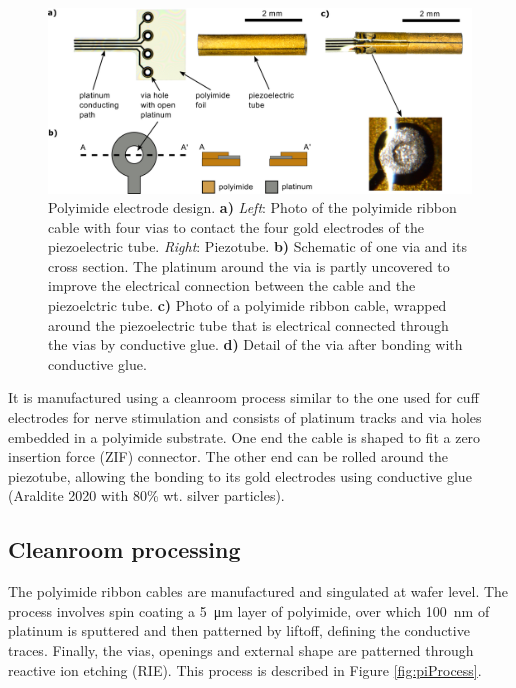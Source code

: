 \begin{figure}[h!]\centering \includegraphics[width=15cm]{figures/40_Fabrication/PI/tubeFoilH.png}
      \caption{Polyimide electrode design.
      \textbf{a)} \textit{Left}: Photo of the polyimide ribbon cable with four vias to contact the four gold electrodes of the piezoelectric tube. \textit{Right}: Piezotube.
      \textbf{b)} Schematic of one via and its cross section. The platinum around the via is partly uncovered to improve the electrical connection between the cable and the piezoelctric tube.
      \textbf{c)} Photo of a polyimide ribbon cable, wrapped around the piezoelectric tube that is electrical connected through the vias by conductive glue.
      \textbf{d)} Detail of the via after bonding with conductive glue.}
      \label{fig:piRolled}
\end{figure}

It is manufactured using a cleanroom process similar to the one used for cuff electrodes for nerve stimulation \cite{Rodriguez2000} and consists of platinum tracks and via holes embedded in a polyimide substrate. One end the cable is shaped to fit a zero insertion force (ZIF) connector. The other end can be rolled around the piezotube, allowing the bonding to its gold electrodes using conductive glue (Araldite 2020 with 80\% wt. silver particles).


\subsection{Cleanroom processing}
The polyimide ribbon cables are manufactured and singulated at wafer level. The process involves spin coating a \SI{5}{\micro\meter} layer of polyimide, over which \SI{100}{\nano\meter} of platinum is sputtered and then patterned by liftoff, defining the conductive traces. Finally, the vias, openings and external shape are patterned through reactive ion etching (RIE). This process is described in Figure \ref{fig:piProcess}.


